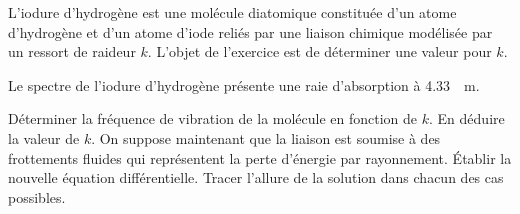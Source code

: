 

L'iodure d'hydrogène est une molécule diatomique constituée d'un atome d'hydrogène et d'un atome d'iode reliés par une liaison chimique modélisée par un ressort de raideur $k$. L'objet de l'exercice est de déterminer une valeur pour $k$.

Le spectre de l'iodure d'hydrogène présente une raie d'absorption à \SI{4.33}{\mu m}.

\question Déterminer la fréquence de vibration de la molécule en fonction de $k$. En déduire la valeur de $k$.
\question On suppose maintenant que la liaison est soumise à des frottements fluides qui représentent la perte d'énergie par rayonnement.
\subquestion Établir la nouvelle équation différentielle.
\subquestion Tracer l'allure de la solution dans chacun des cas possibles.
